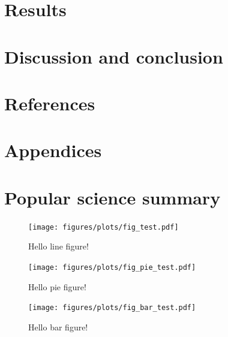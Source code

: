\documentclass[a4paper,11pt]{article}
\begin{document}
\section{Results}
\section{Discussion and conclusion}
\section{References}
\section{Appendices}
\section{Popular science summary}

  \begin{figure}[H]
    \begin{center}
      \texttt{[image: figures/plots/fig\_test.pdf]}
      \caption{Hello line figure!}
    \end{center}
  \end{figure}

  \begin{figure}[H]
    \begin{center}
      \vspace{-0.3cm}
      \texttt{[image: figures/plots/fig\_pie\_test.pdf]}
      \vspace{-0.5cm}
      \caption{Hello pie figure!}
    \end{center}
  \end{figure}

  \begin{figure}[H]
    \begin{center}
      \texttt{[image: figures/plots/fig\_bar\_test.pdf]}
      \caption{Hello bar figure!}
    \end{center}
  \end{figure}

\printbibliography
\end{document}
